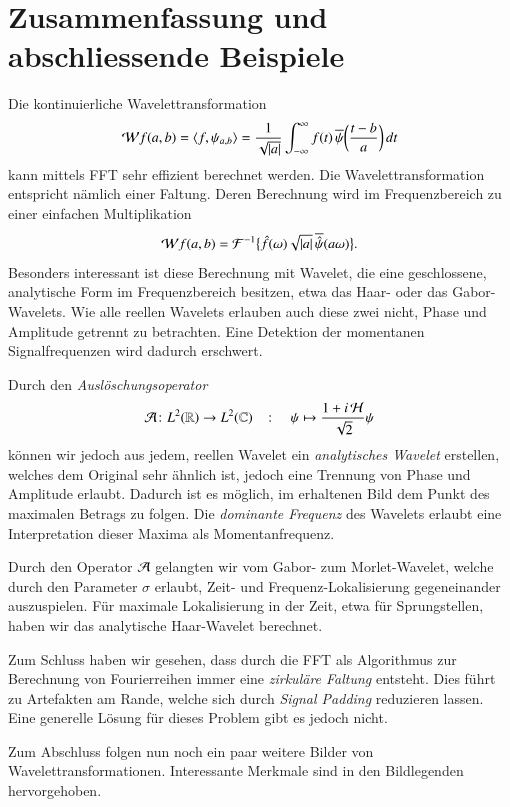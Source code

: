 \section{Zusammenfassung und abschliessende Beispiele}
Die kontinuierliche Wavelettransformation 
\begin{equation}
\Wave f (a,b)
=
\langle f,\psi_{a,b}\rangle
=
\frac{1}{\sqrt{|a|}}\int_{-\infty}^\infty f(t)\,
\overline{\psi}\biggl(\frac{t-b}{a}\biggr)\,dt
\end{equation}
kann mittels FFT sehr effizient berechnet werden.
Die Wavelettransformation entspricht nämlich einer Faltung.
Deren Berechnung wird im Frequenzbereich zu einer einfachen Multiplikation
\begin{equation}
\Wave f(a,b)
= \mathcal{F}^{-1}\bigl\lbrace\hat{f}(\omega) \sqrt{|a|}\, \overline{\hat{\psi}}(a\omega)\bigr\rbrace.
\end{equation}
Besonders interessant ist diese Berechnung mit Wavelet, die eine geschlossene, analytische Form im Frequenzbereich besitzen, etwa das Haar- oder das Gabor-Wavelets.
Wie alle reellen Wavelets erlauben auch diese zwei nicht, Phase und Amplitude getrennt zu betrachten.
Eine Detektion der momentanen Signalfrequenzen wird dadurch erschwert.

Durch den \emph{Auslöschungsoperator}
\[
	\Ana\, \colon L^2(\mathbb R) \to L^2(\mathbb C)
	\quad\colon\quad
	\psi \mapsto \frac{1 + i\Hilb\,}{\sqrt 2}\psi
\]
können wir jedoch aus jedem, reellen Wavelet ein \emph{analytisches Wavelet} erstellen, welches dem Original sehr ähnlich ist, jedoch eine Trennung von Phase und Amplitude erlaubt.
Dadurch ist es möglich, im erhaltenen Bild dem Punkt des maximalen Betrags zu folgen.
Die \emph{dominante Frequenz} des Wavelets erlaubt eine Interpretation dieser Maxima als Momentanfrequenz.

Durch den Operator $\Ana\,$ gelangten wir vom Gabor- zum Morlet-Wavelet, welche durch den Parameter $\sigma$ erlaubt, Zeit- und Frequenz-Lokalisierung gegeneinander auszuspielen.
Für maximale Lokalisierung in der Zeit, etwa für Sprungstellen, haben wir das analytische Haar-Wavelet berechnet.

Zum Schluss haben wir gesehen, dass durch die FFT als Algorithmus zur Berechnung von Fourierreihen immer eine \emph{zirkuläre Faltung} entsteht.
Dies führt zu Artefakten am Rande, welche sich durch \emph{Signal Padding} reduzieren lassen.
Eine generelle Lösung für dieses Problem gibt es jedoch nicht.

Zum Abschluss folgen nun noch ein paar weitere Bilder von Wavelettransformationen.
Interessante Merkmale sind in den Bildlegenden hervorgehoben.


